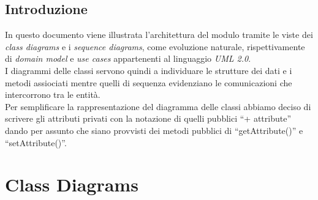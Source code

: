 \documentclass[a4paper, 12pt]{report}
\begin{document}
\tableofcontents

\newpage

\section{Introduzione}
In questo documento viene illustrata l'architettura del modulo tramite le viste dei \emph{class diagrams} e i \emph{sequence diagrams}, come evoluzione naturale, rispettivamente di \emph{domain model} e \emph{use cases} appartenenti al linguaggio \emph{UML 2.0}. \\
I diagrammi delle classi servono quindi a individuare le strutture dei dati e i metodi assiociati mentre quelli di sequenza evidenziano le comunicazioni che intercorrono tra le entit\`a. \\
Per semplificare la rappresentazione del diagramma delle classi abbiamo deciso di scrivere gli attributi privati con la notazione di quelli pubblici ``+ attribute'' dando per assunto che siano provvisti dei metodi pubblici di ``getAttribute()'' e ``setAttribute()''. \\

\chapter{Class Diagrams}
\end{document}
